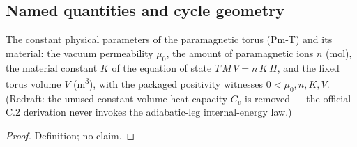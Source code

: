 
\subsection*{Named quantities and cycle geometry}

\begin{definition}
\label{def:IPhO2026Problems_problem_IPhO_2026_3_C_2:TorusParams}
The constant physical parameters of the paramagnetic torus (Pm-T) and
its material: the vacuum permeability $\mu_0$, the amount of
paramagnetic ions $n$ (mol), the material constant $K$ of the equation
of state $T\,M\,V = n\,K\,H$, and the fixed torus volume $V$
(m\textsuperscript{3}), with the packaged positivity witnesses
$0 < \mu_0, n, K, V$.  (Redraft: the unused constant-volume heat
capacity $C_v$ is removed --- the official C.2 derivation never invokes
the adiabatic-leg internal-energy law.)
\end{definition}
\begin{proof}
Definition; no claim.
\end{proof}

